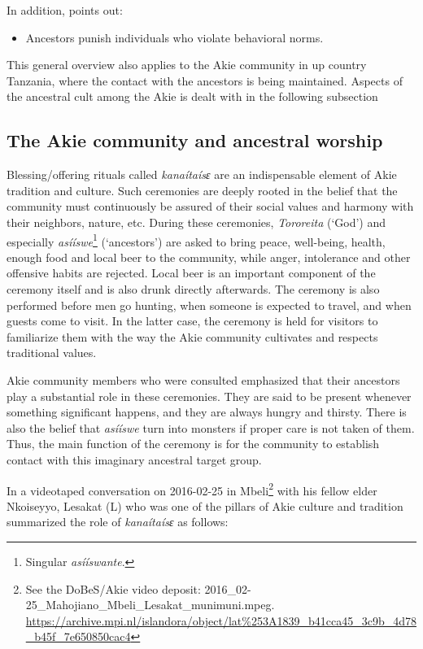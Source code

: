 \documentclass[output=paper,colorlinks,citecolor=brown]{langscibook}
\begin{document}
\noindent In addition, \cite[365]{Ferraro2005} points out: 

\begin{itemize}
    \item Ancestors punish individuals who violate behavioral norms.
\end{itemize}

\noindent This general overview also applies to the Akie community in up country Tanzania, where the contact with the ancestors is being maintained. Aspects of the ancestral cult among the Akie is dealt with in the following subsection

\subsection{The Akie community and ancestral worship}\label{sec:legere:3.2}

Blessing/offering rituals called \textit{kanaítaísɛ} are an indispensable element of Akie tradition and culture. Such ceremonies are deeply rooted in the belief that the community must continuously be assured of their social values and harmony with their neighbors, nature, etc. During these ceremonies, \textit{Tororeita} (‘God’) and especially \textit{asííswe}\footnote{Singular \textit{asííswante}.} (‘ancestors’) are asked to bring peace, well-being, health, enough food and local beer to the community, while anger, intolerance and other offensive habits are rejected. Local beer is an important component of the ceremony itself and is also drunk directly afterwards. The ceremony is also performed before men go hunting, when someone is expected to travel, and when guests come to visit. In the latter case, the ceremony is held for visitors to familiarize them with the way the Akie community cultivates and respects traditional values.

Akie community members who were consulted emphasized that their ancestors play a substantial role in these ceremonies. They are said to be present whenever something significant happens, and they are always hungry and thirsty. There is also the belief that \textit{asííswe} turn into monsters if proper care is not taken of them. Thus, the main function of the ceremony is for the community to establish contact with this imaginary ancestral target group. 

In a videotaped conversation on 2016-02-25 in Mbeli\footnote{See the DoBeS/Akie video deposit: 2016\_02-25\_Mahojiano\_Mbeli\_Lesakat\_munimuni.mpeg.
\url{https://archive.mpi.nl/islandora/object/lat\%253A1839_b41cca45_3c9b_4d78_b45f_7e650850cac4}} with his fellow elder Nkoiseyyo,  Lesakat (L) who was one of the pillars of Akie culture and tradition summarized the role of \textit{kanaítaísɛ} as follows:
\end{document}
